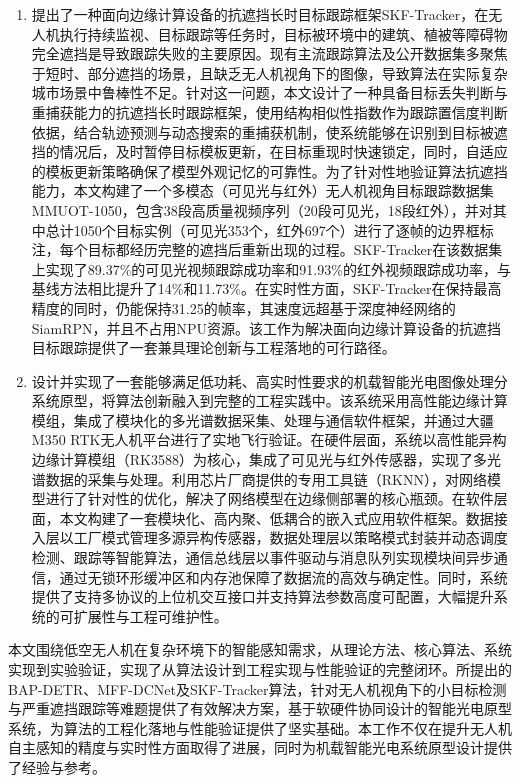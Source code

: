 \begin{enumerate}
    \item[(3)] 提出了一种面向边缘计算设备的抗遮挡长时目标跟踪框架SKF-Tracker，在无人机执行持续监视、目标跟踪等任务时，目标被环境中的建筑、植被等障碍物完全遮挡是导致跟踪失败的主要原因。现有主流跟踪算法及公开数据集多聚焦于短时、部分遮挡的场景，且缺乏无人机视角下的图像，导致算法在实际复杂城市场景中鲁棒性不足。针对这一问题，本文设计了一种具备目标丢失判断与重捕获能力的抗遮挡长时跟踪框架，使用结构相似性指数作为跟踪置信度判断依据，结合轨迹预测与动态搜索的重捕获机制，使系统能够在识别到目标被遮挡的情况后，及时暂停目标模板更新，在目标重现时快速锁定，同时，自适应的模板更新策略确保了模型外观记忆的可靠性。为了针对性地验证算法抗遮挡能力，本文构建了一个多模态（可见光与红外）无人机视角目标跟踪数据集MMUOT-1050，包含38段高质量视频序列（20段可见光，18段红外），并对其中总计1050个目标实例（可见光353个，红外697个）进行了逐帧的边界框标注，每个目标都经历完整的遮挡后重新出现的过程。SKF-Tracker在该数据集上实现了89.37\%的可见光视频跟踪成功率和91.93\%的红外视频跟踪成功率，与基线方法相比提升了14\%和11.73\%。在实时性方面，SKF-Tracker在保持最高精度的同时，仍能保持31.25的帧率，其速度远超基于深度神经网络的SiamRPN，并且不占用NPU资源。该工作为解决面向边缘计算设备的抗遮挡目标跟踪提供了一套兼具理论创新与工程落地的可行路径。
    
    \item[(4)] 设计并实现了一套能够满足低功耗、高实时性要求的机载智能光电图像处理分系统原型，将算法创新融入到完整的工程实践中。该系统采用高性能边缘计算模组，集成了模块化的多光谱数据采集、处理与通信软件框架，并通过大疆M350 RTK无人机平台进行了实地飞行验证。在硬件层面，系统以高性能异构边缘计算模组（RK3588）为核心，集成了可见光与红外传感器，实现了多光谱数据的采集与处理。利用芯片厂商提供的专用工具链（RKNN），对网络模型进行了针对性的优化，解决了网络模型在边缘侧部署的核心瓶颈。在软件层面，本文构建了一套模块化、高内聚、低耦合的嵌入式应用软件框架。数据接入层以工厂模式管理多源异构传感器，数据处理层以策略模式封装并动态调度检测、跟踪等智能算法，通信总线层以事件驱动与消息队列实现模块间异步通信，通过无锁环形缓冲区和内存池保障了数据流的高效与确定性。同时，系统提供了支持多协议的上位机交互接口并支持算法参数高度可配置，大幅提升系统的可扩展性与工程可维护性。
\end{enumerate}

本文围绕低空无人机在复杂环境下的智能感知需求，从理论方法、核心算法、系统实现到实验验证，实现了从算法设计到工程实现与性能验证的完整闭环。所提出的BAP-DETR、MFF-DCNet及SKF-Tracker算法，针对无人机视角下的小目标检测与严重遮挡跟踪等难题提供了有效解决方案，基于软硬件协同设计的智能光电原型系统，为算法的工程化落地与性能验证提供了坚实基础。本工作不仅在提升无人机自主感知的精度与实时性方面取得了进展，同时为机载智能光电系统原型设计提供了经验与参考。

